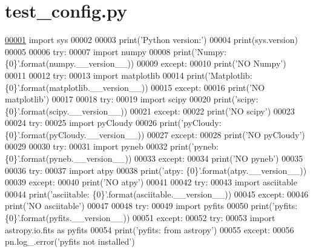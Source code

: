 \hypertarget{test__config_8py_source}{}\section{test\+\_\+config.\+py}
\label{test__config_8py_source}

\begin{DoxyCode}
\hypertarget{test__config_8py_source_l00001}{}\hyperlink{namespacepyneb_1_1utils_1_1test__config}{00001} \textcolor{keyword}{import} sys
00002 
00003 print(\textcolor{stringliteral}{'Python version:'})
00004 print(sys.version)
00005 
00006 \textcolor{keywordflow}{try}:
00007     \textcolor{keyword}{import} numpy
00008     print(\textcolor{stringliteral}{'Numpy: \{0\}'}.format(numpy.\_\_version\_\_))
00009 \textcolor{keywordflow}{except}:
00010     print(\textcolor{stringliteral}{'NO Numpy'})
00011 
00012 \textcolor{keywordflow}{try}:
00013     \textcolor{keyword}{import} matplotlib
00014     print(\textcolor{stringliteral}{'Matplotlib: \{0\}'}.format(matplotlib.\_\_version\_\_))
00015 \textcolor{keywordflow}{except}:
00016     print(\textcolor{stringliteral}{'NO matplotlib'})
00017 
00018 \textcolor{keywordflow}{try}:
00019     \textcolor{keyword}{import} scipy
00020     print(\textcolor{stringliteral}{'scipy: \{0\}'}.format(scipy.\_\_version\_\_))
00021 \textcolor{keywordflow}{except}:
00022     print(\textcolor{stringliteral}{'NO scipy'})
00023 
00024 \textcolor{keywordflow}{try}:
00025     \textcolor{keyword}{import} pyCloudy
00026     print(\textcolor{stringliteral}{'pyCloudy: \{0\}'}.format(pyCloudy.\_\_version\_\_))
00027 \textcolor{keywordflow}{except}:
00028     print(\textcolor{stringliteral}{'NO pyCloudy'})
00029 
00030 \textcolor{keywordflow}{try}:
00031     \textcolor{keyword}{import} pyneb
00032     print(\textcolor{stringliteral}{'pyneb: \{0\}'}.format(pyneb.\_\_version\_\_))
00033 \textcolor{keywordflow}{except}:
00034     print(\textcolor{stringliteral}{'NO pyneb'})
00035     
00036 \textcolor{keywordflow}{try}:
00037     \textcolor{keyword}{import} atpy
00038     print(\textcolor{stringliteral}{'atpy: \{0\}'}.format(atpy.\_\_version\_\_))
00039 \textcolor{keywordflow}{except}:
00040     print(\textcolor{stringliteral}{'NO atpy'})
00041 
00042 \textcolor{keywordflow}{try}:
00043     \textcolor{keyword}{import} asciitable
00044     print(\textcolor{stringliteral}{'asciitable: \{0\}'}.format(asciitable.\_\_version\_\_))
00045 \textcolor{keywordflow}{except}:
00046     print(\textcolor{stringliteral}{'NO asciitable'})
00047 
00048 \textcolor{keywordflow}{try}:
00049     \textcolor{keyword}{import} pyfits
00050     print(\textcolor{stringliteral}{'pyfits: \{0\}'}.format(pyfits.\_\_version\_\_))
00051 \textcolor{keywordflow}{except}:
00052     \textcolor{keywordflow}{try}:
00053         \textcolor{keyword}{import} astropy.io.fits \textcolor{keyword}{as} pyfits
00054         print(\textcolor{stringliteral}{'pyfits: from astropy'})
00055     \textcolor{keywordflow}{except}:
00056         pn.log\_.error(\textcolor{stringliteral}{'pyfits not installed'})
\end{DoxyCode}
